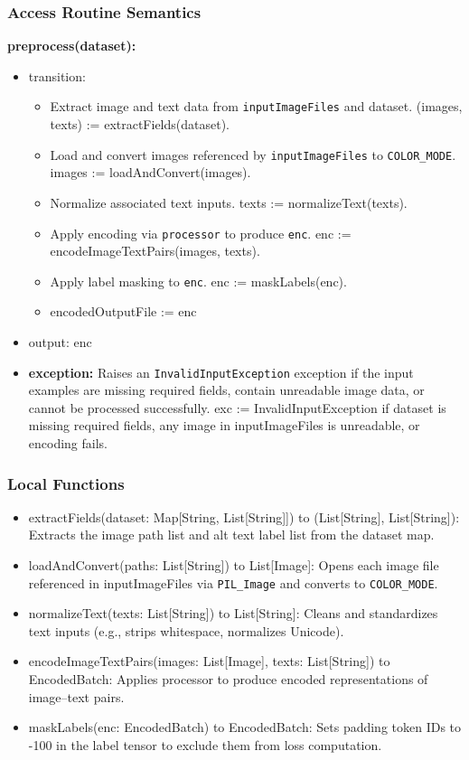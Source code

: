 \documentclass[12pt, titlepage]{article}
\begin{document}
\subsubsection{Access Routine Semantics}
\noindent \textbf{preprocess(dataset):}
\begin{itemize}
  \item transition:
  \begin{itemize}
  \item Extract image and text data from \texttt{inputImageFiles} and dataset. (images, texts) := extractFields(dataset). 
  \item Load and convert images referenced by \texttt{inputImageFiles} to \texttt{COLOR\_MODE}. images := loadAndConvert(images). 
  \item Normalize associated text inputs. texts := normalizeText(texts). 
  \item Apply encoding via \texttt{processor} to produce \texttt{enc}. enc := encodeImageTextPairs(images, texts). 
  \item Apply label masking to \texttt{enc}. enc := maskLabels(enc). 
  \item encodedOutputFile := enc
  \end{itemize}
  \item output: enc
  \item \textbf{exception:} Raises an \texttt{InvalidInputException} exception if the input examples are missing required fields, contain unreadable image data, or cannot be processed successfully. exc := InvalidInputException if dataset is missing required fields, any image in inputImageFiles is unreadable, or encoding fails.
\end{itemize}

\subsubsection{Local Functions}
\begin{itemize}
  \item extractFields(dataset: Map[String, List[String]]) to (List[String], List[String]): Extracts the image path list and alt text label list from the dataset map.
  \item loadAndConvert(paths: List[String]) to List[Image]: Opens each image file referenced in inputImageFiles via \texttt{PIL\_Image} and converts to \texttt{COLOR\_MODE}.
  \item normalizeText(texts: List[String]) to List[String]: Cleans and standardizes text inputs (e.g., strips whitespace, normalizes Unicode).
  \item encodeImageTextPairs(images: List[Image], texts: List[String]) to EncodedBatch: Applies processor to produce encoded representations of image–text pairs.
  \item maskLabels(enc: EncodedBatch) to EncodedBatch: Sets padding token IDs to -100 in the label tensor to exclude them from loss computation.
\end{itemize}
\end{document}
